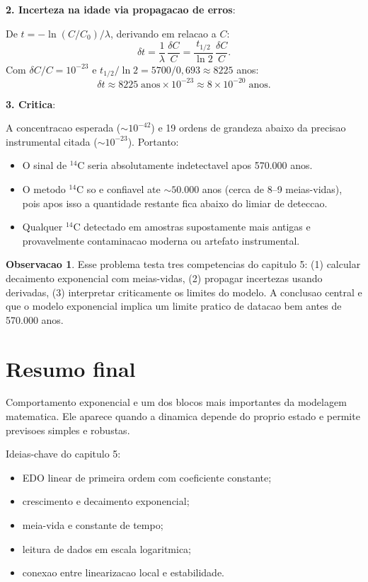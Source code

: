 \documentclass[12pt,a4paper,oneside]{book}
\theoremstyle{definition}
\newtheorem{remark}[definition]{Observacao}
\begin{document}
\textbf{2. Incerteza na idade via propagacao de erros}:

De $t = -\ln(C/C_0)/\lambda$, derivando em relacao a $C$:
\begin{equation}
\delta t = \frac{1}{\lambda}\,\frac{\delta C}{C} = \frac{t_{1/2}}{\ln 2}\,\frac{\delta C}{C}.
\end{equation}
Com $\delta C/C = 10^{-23}$ e $t_{1/2}/\ln 2 = 5700/0{,}693 \approx 8225$ anos:
\begin{equation}
\delta t \approx 8225\;\text{anos} \times 10^{-23} \approx 8 \times 10^{-20}\;\text{anos.}
\end{equation}

\textbf{3. Critica}:

A concentracao esperada ($\sim 10^{-42}$) e 19 ordens de grandeza abaixo da
precisao instrumental citada ($\sim 10^{-23}$). Portanto:
\begin{itemize}
    \item O sinal de ${}^{14}$C seria absolutamente indetectavel apos 570.000 anos.
    \item O metodo ${}^{14}$C so e confiavel ate $\sim 50.000$ anos
    (cerca de 8--9 meias-vidas), pois apos isso a quantidade restante fica abaixo
    do limiar de deteccao.
    \item Qualquer ${}^{14}$C detectado em amostras suposta\-mente mais antigas
    e provavelmente contaminacao moderna ou artefato instrumental.
\end{itemize}

\begin{remark}
Esse problema testa tres competencias do capitulo 5: (1) calcular decaimento
exponencial com meias-vidas, (2) propagar incertezas usando derivadas, (3) interpretar
criticamente os limites do modelo. A conclusao central e que o modelo exponencial
implica um limite pratico de datacao bem antes de 570.000 anos.
\end{remark}

\section{Resumo final}

Comportamento exponencial e um dos blocos mais importantes da modelagem matematica.
Ele aparece quando a dinamica depende do proprio estado e permite previsoes simples e robustas.

Ideias-chave do capitulo 5:
\begin{itemize}
    \item EDO linear de primeira ordem com coeficiente constante;
    \item crescimento e decaimento exponencial;
    \item meia-vida e constante de tempo;
    \item leitura de dados em escala logaritmica;
    \item conexao entre linearizacao local e estabilidade.
\end{itemize}
\end{document}
